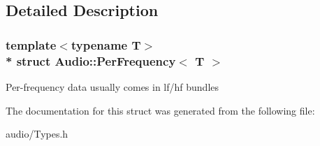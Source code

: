 \subsection{Detailed Description}
\subsubsection*{template$<$typename T$>$\\*
struct Audio\+::\+Per\+Frequency$<$ T $>$}

Per-\/frequency data usually comes in lf/hf bundles 

The documentation for this struct was generated from the following file\+:\begin{DoxyCompactItemize}
\item 
audio/Types.\+h\end{DoxyCompactItemize}
